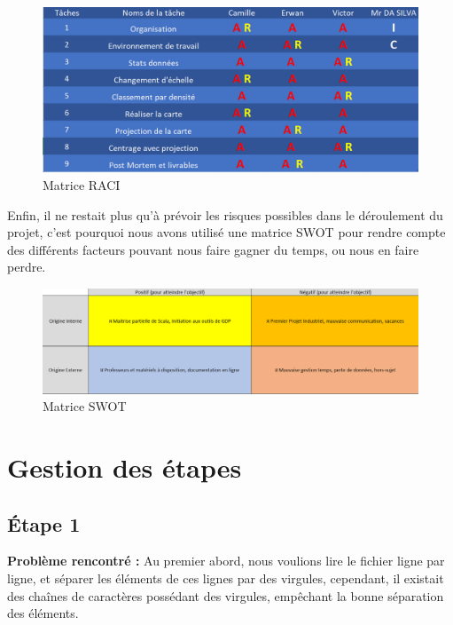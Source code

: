 \documentclass{article}
\begin{document}
\begin{figure}[H]
    \centering
    \includegraphics[scale=0.4]{raci.png}
    \caption{Matrice RACI}
    \label{fig:raci}
\end{figure}

\newpage
Enfin, il ne restait plus qu’à prévoir les risques possibles dans le déroulement du projet, c’est pourquoi nous avons utilisé une matrice SWOT pour rendre compte des différents facteurs pouvant nous faire gagner du temps, ou nous en faire perdre.


\begin{figure}[H]
    \centering
    \includegraphics[scale=0.5]{swot.png}
    \caption{Matrice SWOT}
    \label{fig:swot}
\end{figure}

\vspace{3\baselineskip}

\section{ Gestion des étapes}


\subsection{ Étape 1} 


\textbf{Problème rencontré :} \newline
Au premier abord, nous voulions lire le fichier ligne par ligne, et séparer les éléments de ces lignes par des virgules, cependant, il existait des chaînes de caractères possédant des virgules, empêchant la bonne séparation des éléments.
\end{document}
